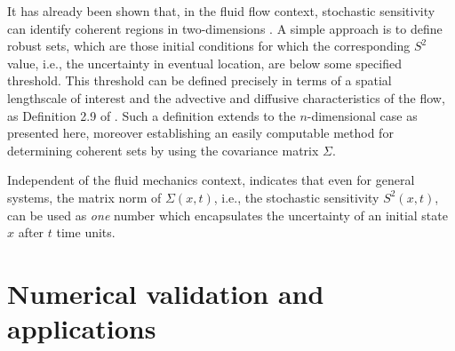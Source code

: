It has already been shown that, in the fluid flow context, stochastic sensitivity can identify coherent regions in two-dimensions \cite{BadzaEtAl_2023_HowSensitiveAre, Balasuriya_2020_StochasticSensitivityComputable}.
A simple approach is to define robust sets, which are those initial conditions for which the corresponding \(S^2\) value, i.e., the uncertainty in eventual location,  are below some specified threshold.
This threshold can be defined precisely in terms of a spatial lengthscale of interest and the advective and diffusive characteristics of the flow, as Definition 2.9 of \cite{Balasuriya_2020_StochasticSensitivityComputable}.
Such a definition extends to the \(n\)-dimensional case as presented here, moreover establishing an easily computable method for determining coherent sets by using the covariance matrix $ \Sigma $.

Independent of the fluid mechanics context,  indicates that even for general systems, the matrix norm
of $ \Sigma(x,t) $, i.e., the stochastic sensitivity $ S^2(x,t) $, can be used as {\em one} number which encapsulates the uncertainty of an initial state $ x $ after $ t $ time units.


% 
\section{Numerical validation and applications}\label{sec:numerics}

